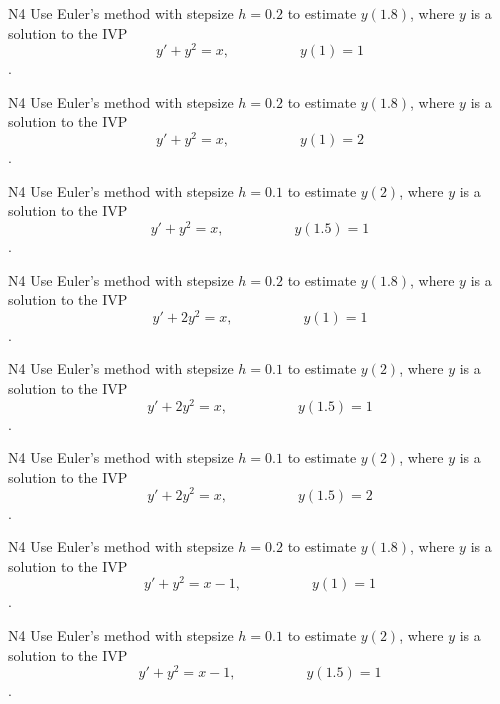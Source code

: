 \begin{problem}{N4}
Use Euler's method with stepsize \(h=0.2\) to estimate \(y(1.8)\), where \(y\) is a solution to the IVP
\[y'+y^2=x,\hspace{5em}y(1)=1\].
\end{problem}

\begin{problem}{N4}
Use Euler's method with stepsize \(h=0.2\) to estimate \(y(1.8)\), where \(y\) is a solution to the IVP
\[y'+y^2=x,\hspace{5em}y(1)=2\].
\end{problem}

\begin{problem}{N4}
Use Euler's method with stepsize \(h=0.1\) to estimate \(y(2)\), where \(y\) is a solution to the IVP
\[y'+y^2=x,\hspace{5em}y(1.5)=1\].
\end{problem}

\begin{problem}{N4}
Use Euler's method with stepsize \(h=0.2\) to estimate \(y(1.8)\), where \(y\) is a solution to the IVP
\[y'+2y^2=x,\hspace{5em}y(1)=1\].
\end{problem}

\begin{problem}{N4}
Use Euler's method with stepsize \(h=0.1\) to estimate \(y(2)\), where \(y\) is a solution to the IVP
\[y'+2y^2=x,\hspace{5em}y(1.5)=1\].
\end{problem}

\begin{problem}{N4}
Use Euler's method with stepsize \(h=0.1\) to estimate \(y(2)\), where \(y\) is a solution to the IVP
\[y'+2y^2=x,\hspace{5em}y(1.5)=2\].
\end{problem}

\begin{problem}{N4}
Use Euler's method with stepsize \(h=0.2\) to estimate \(y(1.8)\), where \(y\) is a solution to the IVP
\[y'+y^2=x-1,\hspace{5em}y(1)=1\].
\end{problem}

\begin{problem}{N4}
Use Euler's method with stepsize \(h=0.1\) to estimate \(y(2)\), where \(y\) is a solution to the IVP
\[y'+y^2=x-1,\hspace{5em}y(1.5)=1\].
\end{problem}


